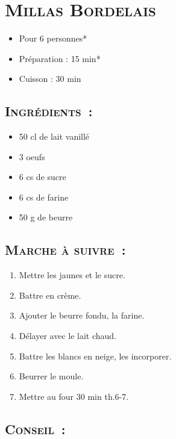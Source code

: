 \section[\normalsize{Millas Bordelais}]{\LARGE{\textsc{Millas Bordelais}}}		%


\begin{itemize}
\item Pour 6 personnes*
\item Préparation : 15 min*
\item Cuisson : 30 min
\end{itemize}

\subsection*{\textsc{Ingr\'edients~:}}

\begin{itemize}
\item 50 cl de lait vanill\'e
\item 3 oeufs
\item 6 cs de sucre
\item 6 cs de farine
\item 50 g de beurre
\end{itemize}


\subsection*{\textsc{Marche \`a suivre~:}}

\begin{enumerate}
\item Mettre les jaunes et le sucre.

\item Battre en cr\`eme.

\item Ajouter le beurre fondu, la farine.

\item D\'elayer avec le lait chaud.

\item Battre les blancs en neige, les incorporer.

\item Beurrer le moule.

\item Mettre au four 30 min th.6-7.
\end{enumerate}
\subsection*{\textsc{Conseil~:}}

